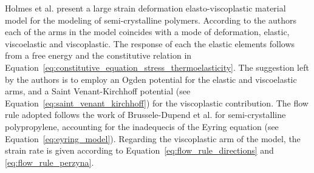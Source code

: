 Holmes et al. \citep{holmesConstitutiveModelLarge2006} present a large strain deformation elasto-viscoplastic material model for the modeling of semi-crystalline polymers.
According to the authors each of the arms in the model coincides with a mode of deformation, elastic, viscoelastic and viscoplastic.
The response of each the elastic elements follows from a free energy and the constitutive relation in Equation~\eqref{eq:constitutive_equation_stress_thermoelasticity}.
The suggestion left by the authors is to employ an Ogden potential for the elastic and viscoelastic arms, and a Saint Venant-Kirchhoff potential (see Equation~\eqref{eq:saint_venant_kirchhoff}) for the viscoplastic contribution.
The flow rule adopted follows the work of
Brussele-Dupend et al. \citep{brusselle_dupendMechanical2001, brusselle_dupendMechanical2003} for semi-crystalline polypropylene, accounting for the inadequecis of the Eyring equation (see Equation~\eqref{eq:eyring_model}).
Regarding the viscoplastic arm of the model, the strain rate is given according to Equation~\eqref{eq:flow_rule_directions} and \eqref{eq:flow_rule_perzyna}.





